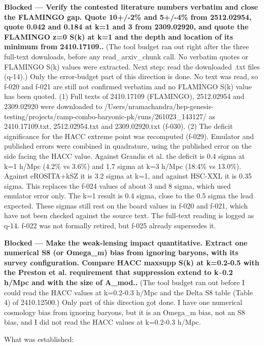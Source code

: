 \documentclass[11pt,a4paper]{article}
\begin{document}
\textbf{Blocked --- Verify the contested literature numbers verbatim and close the FLAMINGO gap. Quote 10+/-2\% and 5+/-4\% from 2512.02954, quote 0.042 and 0.184 at k=1 and 3 from 2309.02920, and quote the FLAMINGO z=0 S(k) at k=1 and the depth and location of its minimum from 2410.17109..} (The tool budget ran out right after the three full-text downloads, before any read\_arxiv\_chunk call. No verbatim quotes or FLAMINGO S(k) values were extracted. Next step: read the downloaded .txt files (q-14).) Only the error-budget part of this direction is done. No text was read, so f-020 and f-021 are still not confirmed verbatim and no FLAMINGO S(k) value has been quoted. (1) Full texts of 2410.17109 (FLAMINGO), 2512.02954 and 2309.02920 were downloaded to /Users/nramachandra/hep-genesis-testing/projects/ramp-combo-baryonic-pk/runs/261023\_143127/ as 2410.17109.txt, 2512.02954.txt and 2309.02920.txt (f-030). (2) The deficit significance for the HACC extreme point was recomputed (f-029). Emulator and published errors were combined in quadrature, using the published error on the side facing the HACC value. Against Grandis et al. the deficit is 0.4 sigma at k=1 h/Mpc (4.2\% vs 3.6\%) and 1.7 sigma at k=3 h/Mpc (18.4\% vs 13.0\%). Against eROSITA+kSZ it is 3.2 sigma at k=1, and against HSC-XXL it is 0.35 sigma. This replaces the f-024 values of about 3 and 8 sigma, which used emulator error only. The k=1 result is 0.4 sigma, close to the 0.5 sigma the lead expected. These sigmas still rest on the board values in f-020 and f-021, which have not been checked against the source text. The full-text reading is logged as q-14. f-022 was not formally retired, but f-025 already supersedes it.

\textbf{Blocked --- Make the weak-lensing impact quantitative. Extract one numerical S8 (or Omega\_m) bias from ignoring baryons, with its survey configuration. Compare HACC maxsupp S(k) at k=0.2-0.5 with the Preston et al. requirement that suppression extend to k\textasciitilde{}0.2 h/Mpc and with the size of A\_mod..} (The tool budget ran out before I could read the HACC values at k=0.2-0.3 h/Mpc and the Delta S8 table (Table 4) of 2410.12500.) Only part of this direction got done. I have one numerical cosmology bias from ignoring baryons, but it is an Omega\_m bias, not an S8 bias, and I did not read the HACC values at k=0.2-0.3 h/Mpc.

What was established:
\end{document}
